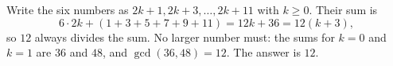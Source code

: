 Write the six numbers as $2k+1,2k+3,\dots,2k+11$ with $k\ge0$. Their sum is
\[
6\cdot2k+(1+3+5+7+9+11)=12k+36=12(k+3),
\]
so $12$ always divides the sum. No larger number must: the sums for $k=0$ and $k=1$ are $36$ and $48$, and $\gcd(36,48)=12$. The answer is $\boxed{12}$.

